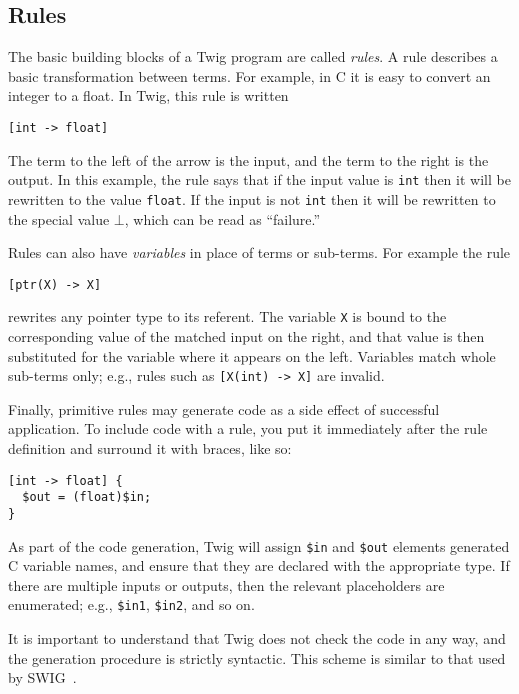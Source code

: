 \subsection{Rules}

The basic building blocks of a Twig program are called \emph{rules}. A rule
describes a basic transformation between terms. For example, in C it is easy
to convert an integer to a float. In Twig, this rule is written

\begin{verbatim}
[int -> float]
\end{verbatim}

The term to the left of the arrow is the input, and the term to the right is
the output. In this example, the rule says that if the input value is
\texttt{int} then it will be rewritten to the value \texttt{float}. If the
input is not \texttt{int} then it will be rewritten to the special value
$\bot$, which can be read as ``failure.''

Rules can also have \emph{variables} in place of terms or sub-terms. For
example the rule

\begin{verbatim}
[ptr(X) -> X]
\end{verbatim}

rewrites any pointer type to its referent. The variable \texttt{X} is bound to
the corresponding value of the matched input on the right, and that value is
then substituted for the variable where it appears on the left. Variables
match whole sub-terms only; e.g., rules such as \texttt{[X(int) -> X]} are
invalid.

Finally, primitive rules may generate code as a side effect of successful
application. To include code with a rule, you put it immediately after the
rule definition and surround it with braces, like so:

\begin{verbatim}
[int -> float] {
  $out = (float)$in;
}
\end{verbatim}

As part of the code generation, Twig will assign \texttt{\$in} and
\texttt{\$out} elements generated C variable names, and ensure that they are
declared with the appropriate type. If there are multiple inputs or outputs,
then the relevant placeholders are enumerated; e.g., \texttt{\$in1},
\texttt{\$in2}, and so on.

It is important to understand that Twig does not check the code in any way,
and the generation procedure is strictly syntactic. This scheme is similar to
that used by SWIG~\cite{swig}.

